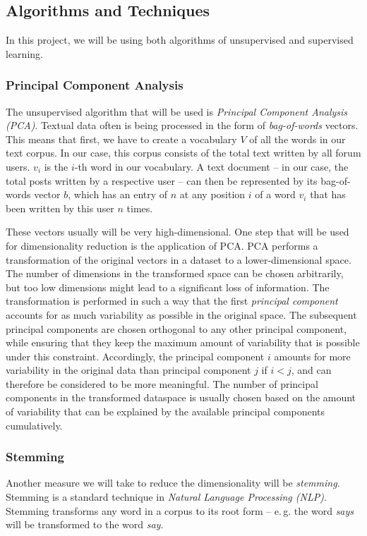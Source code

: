 \documentclass[12pt]{elsarticle}
\begin{document}
\subsection{Algorithms and Techniques}
In this project, we will be using both algorithms of unsupervised and supervised learning. 

\subsubsection{Principal Component Analysis}
The unsupervised algorithm that will be used is \textit{Principal Component Analysis (PCA)}. Textual data often is being processed in the form of \textit{bag-of-words} vectors. This means that first, we have to create a vocabulary $V$ of all the words in our text corpus. In our case, this corpus consists of the total text written by all forum users. $v_i$ is the $i$-th word in our vocabulary. A text document -- in our case, the total posts written by a respective user -- can then be represented by its bag-of-words vector $b$, which has an entry of $n$ at any position $i$ of a word $v_i$ that has been written by this user $n$ times.

These vectors usually will be very high-dimensional. One step that will be used for dimensionality reduction is the application of PCA. PCA performs a transformation of the original vectors in a dataset to a lower-dimensional space. The number of dimensions in the transformed space can be chosen arbitrarily, but too low dimensions might lead to a significant loss of information. The transformation is performed in such a way that the first \textit{principal component} accounts for as much variability as possible in the original space. The subsequent principal components are chosen orthogonal to any other principal component, while ensuring that they keep the maximum amount of variability that is possible under this constraint. Accordingly, the principal component $i$ amounts for more variability in the original data than principal component $j$ if $i < j$, and can therefore be considered to be more meaningful. The number of principal components in the transformed dataspace is usually chosen based on the amount of variability that can be explained by the available principal components cumulatively.




\subsubsection{Stemming}
Another measure we will take to reduce the dimensionality will be \textit{stemming}. Stemming is a standard technique in \textit{Natural Language Processing (NLP)}. Stemming transforms any word in a corpus to its root form -- e.\,g. the word \textit{says} will be transformed to the word \textit{say}. 
\end{document}
